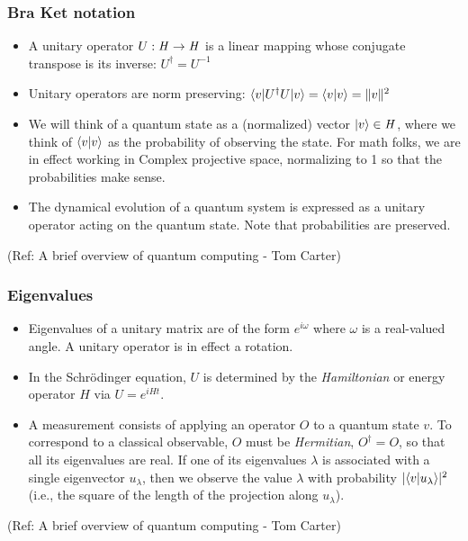  \begin{frame}[fragile]\frametitle{Bra Ket notation}

	\begin{itemize}		
	\item A unitary operator $ U : \mathit{H} \to \mathit{H} $ is a linear mapping
		whose conjugate transpose is its inverse:  $ U^\dag = U^{-1} $
	\item Unitary operators are norm preserving: \newline
		$ \langle{v}| U^\dag U |{v}\rangle = \langle{v}|{v}\rangle = \Vert v \Vert ^2 $
	\item We will think of a quantum state as a (normalized) vector $ |{v}\rangle \in \mathit{H} $,
		where we think of $\langle{v}|{v}\rangle$ as the probability of observing the state.
		For math folks, we are in effect working in Complex projective space, normalizing
		to 1 so that the probabilities make sense.
	\item The dynamical evolution of a quantum system is expressed as a unitary operator acting on
		the quantum state.  Note that probabilities are preserved.
\end{itemize}

\tiny{(Ref: A brief overview of quantum computing - Tom Carter)}

\end{frame}

 \begin{frame}[fragile]\frametitle{Eigenvalues}

\begin{itemize}
	\item Eigenvalues of a unitary matrix are of the form $ e ^ {i\omega} $ where $\omega$ is a
		real-valued angle.  A unitary operator is in effect a rotation.
	\item In the Schr\"odinger equation, $U$ is determined by the {\em Hamiltonian} or
		energy operator $H$ via $U = e^{iHt}$.
	\item A measurement consists of applying an operator $O$ to a quantum state $v$.  To
		correspond to a classical observable, $O$ must be {\em Hermitian}, $O^\dag = O$, so
		that all its eigenvalues are real.  If one of its eigenvalues $\lambda$ is associated with
		a single eigenvector $u_\lambda$, then we observe the value $\lambda$ with probability
		$\vert \langle{v}|{u_\lambda}\rangle \vert ^ 2$ (i.e., the square of the length of
		the projection along $u_\lambda$).
\end{itemize}

\tiny{(Ref: A brief overview of quantum computing - Tom Carter)}

\end{frame}

